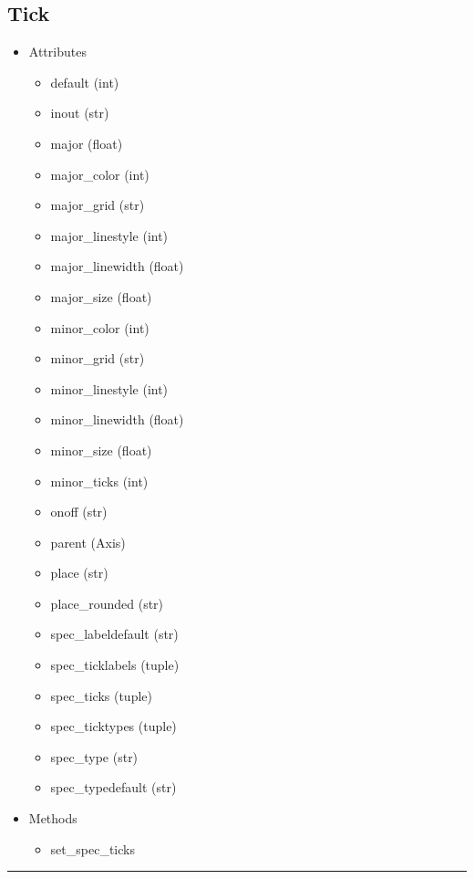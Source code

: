 \documentclass[10pt]{article}
\begin{document}
\begin{multicols}{4}
\subsection*{\footnotesize Tick}
\begin{itemize}
\item Attributes
\begin{itemize}
\item default (int)
\item inout (str)
\item major (float)
\item major\_color (int)
\item major\_grid (str)
\item major\_linestyle (int)
\item major\_linewidth (float)
\item major\_size (float)
\item minor\_color (int)
\item minor\_grid (str)
\item minor\_linestyle (int)
\item minor\_linewidth (float)
\item minor\_size (float)
\item minor\_ticks (int)
\item onoff (str)
\item parent (Axis)
\item place (str)
\item place\_rounded (str)
\item spec\_labeldefault (str)
\item spec\_ticklabels (tuple)
\item spec\_ticks (tuple)
\item spec\_ticktypes (tuple)
\item spec\_type (str)
\item spec\_typedefault (str)
\end{itemize}
\item Methods
\begin{itemize}
\item set\_spec\_ticks
\end{itemize}
\end{itemize}
\vspace{0.5em}
\hrule
\vspace{0.1em}

\end{multicols}
\end{document}
